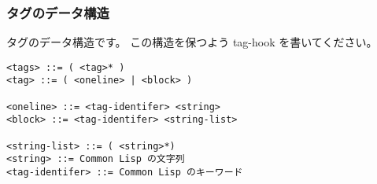 \documentclass[a4j]{jsarticle}
\begin{document}
\subsubsection{タグのデータ構造}
タグのデータ構造です。
この構造を保つよう tag-hook を書いてください。

\begin{lstlisting}[caption=タグのデータ構造]
<tags> ::= ( <tag>* )
<tag> ::= ( <oneline> | <block> )

<oneline> ::= <tag-identifer> <string>
<block> ::= <tag-identifer> <string-list>

<string-list> ::= ( <string>*)
<string> ::= Common Lisp の文字列
<tag-identifer> ::= Common Lisp のキーワード

\end{lstlisting}
\end{document}
